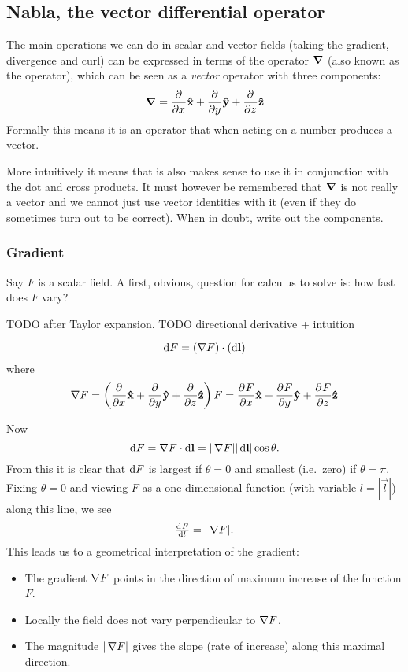 \subsection{Nabla, the vector differential operator}
The main operations we can do in scalar and vector fields (taking the gradient, divergence and curl) can be expressed in terms of the  operator $\operatorname{\boldsymbol{\mathrm{\nabla}}}$ (also known as the  operator), which can be seen as a \textit{vector} operator with three components:
\[ \operatorname{\boldsymbol{\mathrm{\nabla}}} =  \frac{\partial{^{}}}{\partial{{x}^{}}} \boldsymbol{\mathrm{\hat{x}}} +  \frac{\partial{^{}}}{\partial{{y}^{}}} \boldsymbol{\mathrm{\hat{y}}} +  \frac{\partial{^{}}}{\partial{{z}^{}}} \boldsymbol{\mathrm{\hat{z}}} \]
Formally this means it is an operator that when acting on a number produces a vector. 

More intuitively it means that is also makes sense to use it in conjunction with the dot and cross products. It must however be remembered that $\operatorname{\boldsymbol{\mathrm{\nabla}}}$ is not really a vector and we cannot just use vector identities with it (even if they do sometimes turn out to be correct). When in doubt, write out the components.

\subsubsection{Gradient}
Say $F$ is a scalar field. A first, obvious, question for calculus to solve is: how fast does $F$ vary?

TODO after Taylor expansion. TODO directional derivative + intuition

\[ \operatorname{d \!}{F} = (\mathop{}\! \nabla F)\cdot (\operatorname{d \!}{\boldsymbol{\mathrm{l}}}) \]
where
\[ \mathop{}\! \nabla F = \left( \frac{\partial{^{}}}{\partial{{x}^{}}} \boldsymbol{\mathrm{\hat{x}}} +  \frac{\partial{^{}}}{\partial{{y}^{}}} \boldsymbol{\mathrm{\hat{y}}} +  \frac{\partial{^{}}}{\partial{{z}^{}}} \boldsymbol{\mathrm{\hat{z}}}\right)F =  \frac{\partial{^{}}F}{\partial{{x}^{}}} \boldsymbol{\mathrm{\hat{x}}} +  \frac{\partial{^{}}F}{\partial{{y}^{}}} \boldsymbol{\mathrm{\hat{y}}} +  \frac{\partial{^{}}F}{\partial{{z}^{}}} \boldsymbol{\mathrm{\hat{z}}} \]

Now
\[ \operatorname{d \!}{F} = \mathop{}\! \nabla F \cdot \operatorname{d \!}{\boldsymbol{\mathrm{l}}} = |\mathop{}\! \nabla F||\operatorname{d \!}{\boldsymbol{\mathrm{l}}}|\cos\theta. \]
From this it is clear that $\operatorname{d \!}{F}$ is largest if $\theta = 0$ and smallest (i.e.\ zero) if $\theta = \pi$. Fixing $\theta = 0$ and viewing $F$ as a one dimensional function (with variable $l = |\vec{l}|$) along this line, we see
\[ \od{F}{l} = |\grad F|. \]
This leads us to a geometrical interpretation of the gradient:
\begin{itemize}
\item The gradient $\mathop{}\! \nabla F$ points in the direction of maximum increase of the function $F$.
\item Locally the field does not vary perpendicular to $\mathop{}\! \nabla F$.
\item The magnitude $|\mathop{}\! \nabla F|$ gives the slope (rate of increase) along this maximal direction.
\end{itemize}

